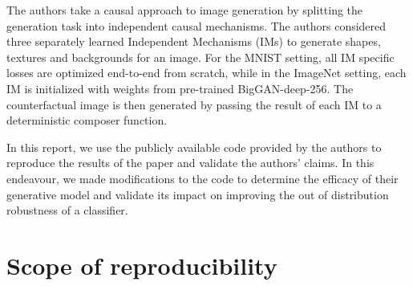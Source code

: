 
The authors take a causal approach to image generation by splitting the generation task into independent causal mechanisms. The authors considered three separately learned Independent Mechanisms (IMs) to generate shapes, textures and backgrounds for an image. For the MNIST setting, all IM specific losses are optimized end-to-end from scratch, while in the ImageNet setting, each IM is initialized with weights from pre-trained BigGAN-deep-256\citep{brock2019large}. The counterfactual image is then generated by passing the result of each IM to a deterministic composer function.

In this report, we use the publicly available code provided by the authors to reproduce the results of the paper and validate the authors' claims. In this endeavour, we made modifications to the code to determine the efficacy of their generative model and validate its impact on improving the out of distribution robustness of a classifier.

\section{Scope of reproducibility}
\label{sec:claims}



